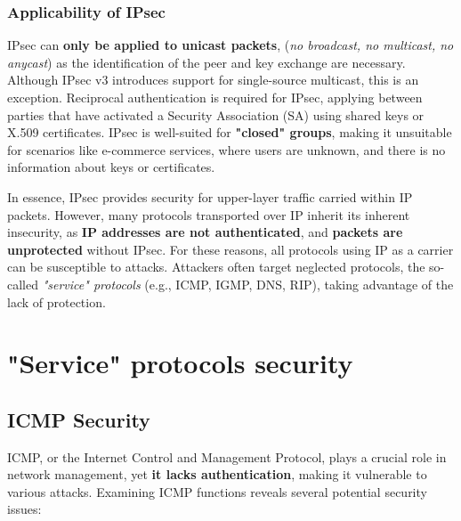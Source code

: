 \subsubsection{Applicability of IPsec}
IPsec can \textbf{only be applied to unicast packets}, (\textit{no broadcast, no multicast, no anycast}) as the identification of the peer and key exchange are necessary. Although IPsec v3 introduces support for single-source multicast, this is an exception. Reciprocal authentication is required for IPsec, applying between parties that have activated a Security Association (SA) using shared keys or X.509 certificates. IPsec is well-suited for \textbf{"closed" groups}, making it unsuitable for scenarios like e-commerce services, where users are unknown, and there is no information about keys or certificates.

In essence, IPsec provides security for upper-layer traffic carried within IP packets. However, many protocols transported over IP inherit its inherent insecurity, as \textbf{IP addresses are not authenticated}, and \textbf{packets are unprotected} without IPsec. For these reasons, all protocols using IP as a carrier can be susceptible to attacks. Attackers often target neglected protocols, the so-called \textit{"service" protocols} (e.g., ICMP, IGMP, DNS, RIP), taking advantage of the lack of protection.


\section{"Service" protocols security}
\subsection{ICMP Security}

ICMP, or the Internet Control and Management Protocol, plays a crucial role in network management, yet \textbf{it lacks authentication}, making it vulnerable to various attacks. Examining ICMP functions reveals several potential security issues:


